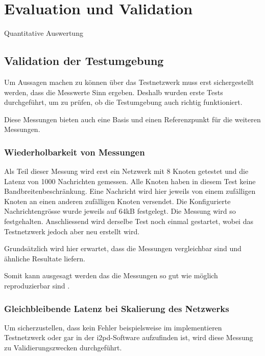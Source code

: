 \chapter{Evaluation und Validation}
\label{ch:evaluation}


Quantitative Auswertung

\section{Validation der Testumgebung}

Um Aussagen machen zu können über das Testnetzwerk muss erst sichergestellt werden, dass die Messwerte Sinn ergeben.
Deshalb wurden erste Tests durchgeführt, um zu prüfen, ob die Testumgebung auch richtig funktioniert.

Diese Messungen bieten auch eine Basis und einen Referenzpunkt für die weiteren Messungen.

\subsection{Wiederholbarkeit von Messungen}

Als Teil dieser Messung wird erst ein Netzwerk mit 8 Knoten getestet und die Latenz von 1000 Nachrichten gemessen.
Alle Knoten haben in diesem Test keine Bandbreitenbeschränkung.
Eine Nachricht wird hier jeweils von einem zufälligen Knoten an einen anderen zufälligen Knoten versendet.
Die Konfigurierte Nachrichtengrösse wurde jeweils auf 64kB festgelegt.
Die Messung wird so festgehalten.
Anschliessend wird derselbe Test noch einmal gestartet, wobei das Testnetzwerk jedoch aber neu erstellt wird.

Grundsätzlich wird hier erwartet, dass die Messungen vergleichbar sind und ähnliche Resultate liefern.

Somit kann ausgesagt werden das die Messungen so gut wie möglich reproduzierbar sind .


\subsection{Gleichbleibende Latenz bei Skalierung des Netzwerks}

Um sicherzustellen, dass kein Fehler beispielsweise im implementieren Testnetzwerk oder gar in der i2pd-Software aufzufinden ist, wird diese Messung zu Validierungszwecken durchgeführt.

